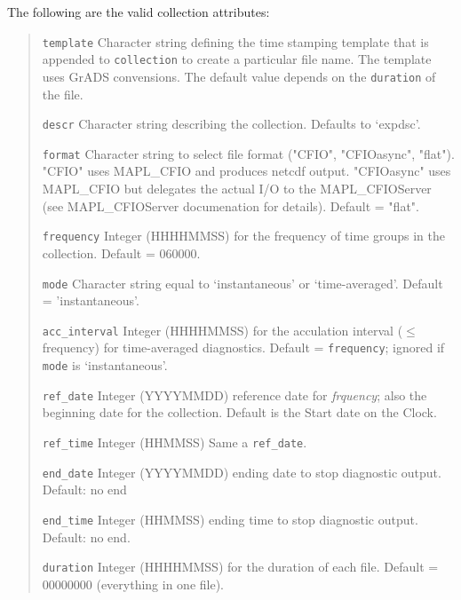  The following are the valid collection attributes:
 \begin{quote}
 \begin{trivlist}
 \item[\tt template]      Character string defining the time stamping template that is appended 
                          to {\tt collection} to create a particular file name. 
                          The template uses GrADS convensions. 
                          The default value depends on the {\tt duration} of the file.
 \item[\tt descr]         Character string describing the collection. Defaults to `expdsc'.
 \item[\tt format]        Character string to select file format ("CFIO", "CFIOasync", "flat").  "CFIO"
                          uses MAPL\_CFIO and produces netcdf output. "CFIOasync" uses MAPL\_CFIO but
                          delegates the actual I/O to the MAPL\_CFIOServer (see MAPL\_CFIOServer documenation for details).
                          Default = "flat".
 \item[\tt frequency]     Integer (HHHHMMSS) for the frequency of time groups in the collection.
                          Default = 060000.
 \item[\tt mode]          Character string equal to `instantaneous' or `time-averaged'.
                          Default = 'instantaneous'.
 \item[\tt acc\_interval] Integer (HHHHMMSS) for the acculation interval ($\le$ frequency)
                          for time-averaged diagnostics. Default = {\tt frequency}; ignored
                          if {\tt mode} is `instantaneous'.
 \item[\tt ref\_date]     Integer (YYYYMMDD) reference date for {\em frquency};
                          also the beginning date for
                          the collection. Default is the Start date on the Clock.
 \item[\tt ref\_time]     Integer (HHMMSS) Same a {\tt ref\_date}.
 \item[\tt end\_date]     Integer (YYYYMMDD) ending date to stop diagnostic output.
                          Default: no end
 \item[\tt end\_time]     Integer (HHMMSS) ending time to stop diagnostic output.
                          Default: no end.
 \item[\tt duration]      Integer (HHHHMMSS) for the duration of each file. 
                          Default = 00000000 (everything in one file).

\end{trivlist}
\end{quote}
